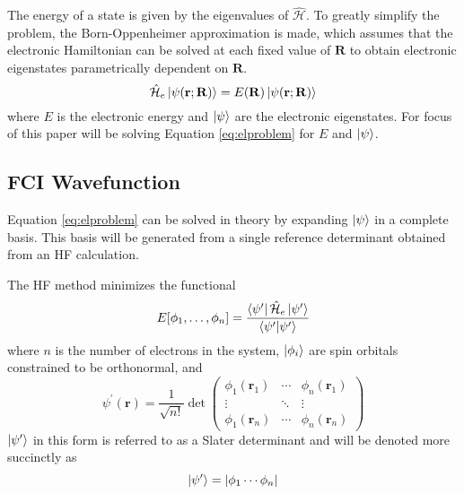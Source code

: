 \documentclass[final,3p,times,twocolumn]{elsarticle}
\newcommand{\ham}{\hat{\mathcal{H}}}
\begin{document}
The energy of a state is given by the eigenvalues of $\ham$. To greatly simplify the problem, the Born-Oppenheimer approximation\cite{bo} is made, which assumes that the electronic Hamiltonian can be solved at each fixed value of $\mathbf{R}$ to obtain electronic eigenstates parametrically dependent on $\mathbf{R}$.
\begin{equation}\label{eq:elproblem}
\ham_e \ket{\psi(\mathbf{r};\mathbf{R})} = E(\mathbf{R}) \ket{\psi(\mathbf{r};\mathbf{R})}
\end{equation}
where $E$ is the electronic energy and $\ket{\psi}$ are the electronic eigenstates. For focus of this paper will be solving Equation \eqref{eq:elproblem} for $E$ and $\ket{\psi}$.

\subsection{FCI Wavefunction} \label{sec:wf}
Equation \eqref{eq:elproblem} can be solved in theory by expanding $\ket{\psi}$ in a complete basis. This basis will be generated from a single reference determinant obtained from an HF calculation. 

The HF method\cite{hartree,fock,roothaan} minimizes the functional
\begin{equation}
E[\phi_1, \ldots, \phi_n] = \dfrac{\bra{\psi^\prime}\ham_e\ket{\psi^\prime}}{\bra{\psi^\prime}\ket{\psi^\prime}}
\end{equation}
where $n$ is the number of electrons in the system, $\ket{\phi_i}$ are spin orbitals constrained to be orthonormal, and 
\begin{equation} \label{eq:det}
\psi^\prime(\mathbf{r}) = \dfrac{1}{\sqrt{n!}}\det\begin{pmatrix} \phi_1(\mathbf{r}_1) & \cdots & \phi_n(\mathbf{r}_1) \\ \vdots & \ddots & \vdots \\
\phi_1(\mathbf{r}_n) & \cdots & \phi_n(\mathbf{r}_n) \end{pmatrix}
\end{equation}
$\ket{\psi^\prime}$ in this form is referred to as a Slater determinant\cite{slater} and will be denoted more succinctly as
\begin{equation}
\ket{\psi^\prime} = |\phi_1 \cdots \phi_n|
\end{equation}
\end{document}
